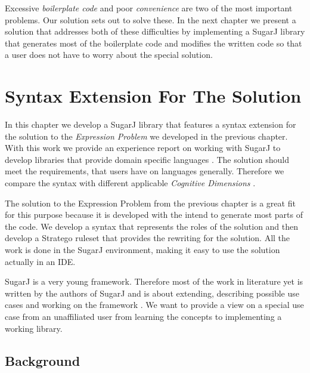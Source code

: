 \documentclass{report}
\begin{document}
Excessive \emph{boilerplate code} and poor \emph{convenience} are two of the most important problems. Our solution sets out to solve these. In the next chapter we present a solution that addresses both of these difficulties by implementing a SugarJ library that generates most of the boilerplate code and modifies the written code so that a user does not have to worry about the special solution.











\chapter{Syntax Extension For The Solution}

In this chapter we develop a SugarJ library that features a syntax extension for the solution to the \emph{Expression Problem} we developed in the previous chapter. With this work we provide an experience report on working with SugarJ to develop libraries that provide domain specific languages \cite{Erdweg-SugarJ-2011}. The solution should meet the requirements, that users have on languages generally. Therefore we compare the syntax with different applicable \emph{Cognitive Dimensions} \cite{Green-Cognitive-1996}.

The solution to the Expression Problem from the previous chapter is a great fit for this purpose because it is developed with the intend to generate most parts of the code. We develop a syntax that represents the roles of the solution and then develop a Stratego ruleset that provides the rewriting for the solution. All the work is done in the SugarJ environment, making it easy to use the solution actually in an IDE.

SugarJ is a very young framework. Therefore most of the work in literature yet is written by the authors of SugarJ and is about extending, describing possible use cases and working on the framework \cite{Fehrenbach-Retrofitting-2011, Erdweg-Composition-2012, Erdweg-Editor-2011, Erdweg-SugarHaskell-2012, Erdweg-Questionnaire-2013}. We want to provide a view on a special use case from an unaffiliated user from learning the concepts to implementing a working library.


\section{Background}
\end{document}
